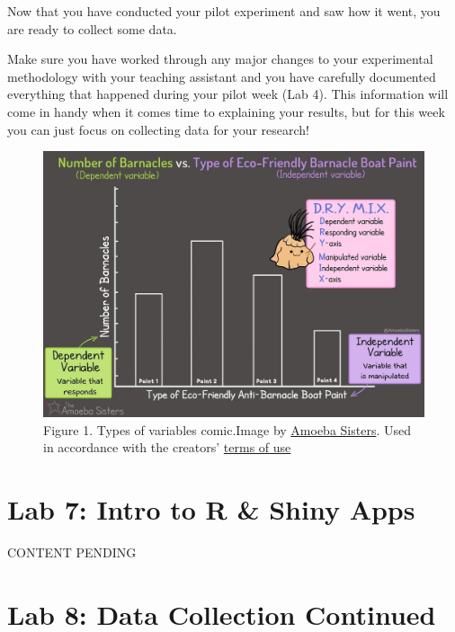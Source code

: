 \documentclass[
]{book}
\begin{document}
Now that you have conducted your pilot experiment and saw how it went, you are ready to collect some data.

Make sure you have worked through any major changes to your experimental methodology with your teaching assistant and you have carefully documented everything that happened during your pilot week (Lab 4). This information will come in handy when it comes time to explaining your results, but for this week you can just focus on collecting data for your research!

\begin{figure}
\centering
\includegraphics{figures_images/Lab6-Fig1.jpg}
\caption{Figure 1. Types of variables comic.Image by \href{https://www.amoebasisters.com/parameciumparlorcomics/category/nature-of-science/2}{Amoeba Sisters}. Used in accordance with the creators' \href{https://www.amoebasisters.com/termsofuse.html}{terms of use}}
\end{figure}

\hypertarget{lab-7-intro-to-r-shiny-apps}{%
\chapter*{Lab 7: Intro to R \& Shiny Apps}\label{lab-7-intro-to-r-shiny-apps}}

CONTENT PENDING

\hypertarget{lab-8-data-collection-continued}{%
\chapter*{Lab 8: Data Collection Continued}\label{lab-8-data-collection-continued}}
\end{document}
